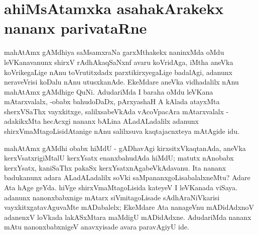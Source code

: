\makeatletter
\def\@makechapterhead#1{%
  \vspace*{10\p@}%
{\fontsize{13pt}{13pt}\selectfont\raggedright{\bf  i. sATxnfli joVnfsx}\par}
\vspace*{25\p@}%
  {\parindent \z@ \centering \normalfont
    \ifnum \c@secnumdepth >\m@ne
      \if@mainmatter
        {\LARGE\bfseries  #1}\par\nobreak
	\vskip 4pt
      \fi
    \fi
\smallskip 

 \vskip 10\p@  
{\fontsize{12pt}{12pt}\selectfont\raggedleft{anu: \bf pu.ti.na.}\par}
  }
\vskip 40\p@}
\makeatother

\chapter{ahiMsAtamxka asahakArakekx nananx parivataRne}\label{chap1}


mahAtAmx gAMdhiya saMsamxraNa garxMthakekx naninxMda oMdu leVKanavanunx shirxV rAdhAkaqSaNxnf avaru koVridAga, iMtha aneVka koVrikegaLige nAnu toVrutitxdadx parxtikirxyegaLige badalAgi, adanunx neraveVrisi koDalu nAnu utusxkanAde. EkeMdare aneVka vidhadalilx nAnu mahAtAmx gAMdhige QuNi. AdudariMda I baraha oMdu leVKana mAtarxvalalx, -obabx bahudoDaDx, pArxyashaH A kAlada atayxMta sherxVSaThx vayxkitxge, salilxsabeVkAda vAcoVpacAra mAtarxvalalx - adakikxMta hecAcxgi nananx bALina ALadALadalilx adanunx shirxVmaMtagoLisidAtanige nAnu salilxsuva kaqtajacnxteya mAtAgide idu.

mahAtAmx gAMdhi obabx hiMdU - gADhavAgi kirxsitxVkaqtanAda, aneVka kerxVsatxri\-giMtalU kerxYsatx enanxbahudAda hiMdU; matutx nAnobabx kerxYsatx, kaniSaThx pakaSx kerxYsatxnAgabeVkAdavanu. Ita nananx badukanunx adara ALadALadalilx soVki saMpananxgoLisabalalxneMtu? Adare Ata hAge geYda. hiVge shirxVmaMtagoLisida kateyeV I leVKanada viSaya. adanunx nanonxbabxnige mAtarx siVmitagoLisade sAdhAraNiVkarisi vayxkitxgatavAguvaMte mADabalelx; EkeMdare Ata nanageVnu mADidAdxnoV adanenxV loVkada lakASxMtara maMdigU mADidAdxne. AdudariMda nananx mAtu nanonxbabxnigeV anavxyisade avara paravAgiyU ide. 

